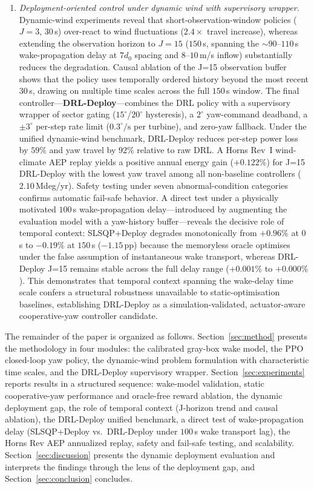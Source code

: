 \documentclass[final,5p,times]{elsarticle}
\begin{document}
\begin{enumerate}
\item \emph{Deployment-oriented control under dynamic wind with supervisory wrapper.} Dynamic-wind experiments reveal that short-observation-window policies ($J{=}3$, $30$\,s) over-react to wind fluctuations ($2.4{\times}$ travel increase), whereas extending the observation horizon to $J{=}15$ ($150$\,s, spanning the ${\sim}90$--$110$\,s wake-propagation delay at $7d_0$ spacing and $8$--$10$\,m/s inflow) substantially reduces the degradation. Causal ablation of the J=15 observation buffer shows that the policy uses temporally ordered history beyond the most recent $30$\,s, drawing on multiple time scales across the full $150$\,s window. The final controller---\textbf{DRL-Deploy}---combines the DRL policy with a supervisory wrapper of sector gating ($15^\circ$/$20^\circ$ hysteresis), a $2^\circ$ yaw-command deadband, a ${\pm}3^\circ$ per-step rate limit ($0.3^\circ\!/\!\mathrm{s}$ per turbine), and zero-yaw fallback. Under the unified dynamic-wind benchmark, DRL-Deploy reduces per-step power loss by $59\%$ and yaw travel by $92\%$ relative to raw DRL. A Horns Rev~I wind-climate AEP replay yields a positive annual energy gain ($+0.122\%$) for J=15 DRL-Deploy with the lowest yaw travel among all non-baseline controllers ($2.10$\,Mdeg/yr). Safety testing under seven abnormal-condition categories confirms automatic fail-safe behavior. A direct test under a physically motivated $100$\,s wake-propagation delay---introduced by augmenting the evaluation model with a yaw-history buffer---reveals the decisive role of temporal context: SLSQP+Deploy degrades monotonically from $+0.96\%$ at $0$\,s to $-0.19\%$ at $150$\,s ($-1.15$\,pp) because the memoryless oracle optimises under the false assumption of instantaneous wake transport, whereas DRL-Deploy J=15 remains stable across the full delay range ($+0.001\%$ to $+0.000\%$). This demonstrates that temporal context spanning the wake-delay time scale confers a structural robustness unavailable to static-optimisation baselines, establishing DRL-Deploy as a simulation-validated, actuator-aware cooperative-yaw controller candidate.
\end{enumerate}

The remainder of the paper is organized as follows. Section~\ref{sec:method} presents the methodology in four modules: the calibrated gray-box wake model, the PPO closed-loop yaw policy, the dynamic-wind problem formulation with characteristic time scales, and the DRL-Deploy supervisory wrapper. Section~\ref{sec:experiments} reports results in a structured sequence: wake-model validation, static cooperative-yaw performance and oracle-free reward ablation, the dynamic deployment gap, the role of temporal context (J-horizon trend and causal ablation), the DRL-Deploy unified benchmark, a direct test of wake-propagation delay (SLSQP+Deploy vs.\ DRL-Deploy under $100$\,s wake transport lag), the Horns Rev AEP annualized replay, safety and fail-safe testing, and scalability. Section~\ref{sec:discussion} presents the dynamic deployment evaluation and interprets the findings through the lens of the deployment gap, and Section~\ref{sec:conclusion} concludes.
\end{document}
